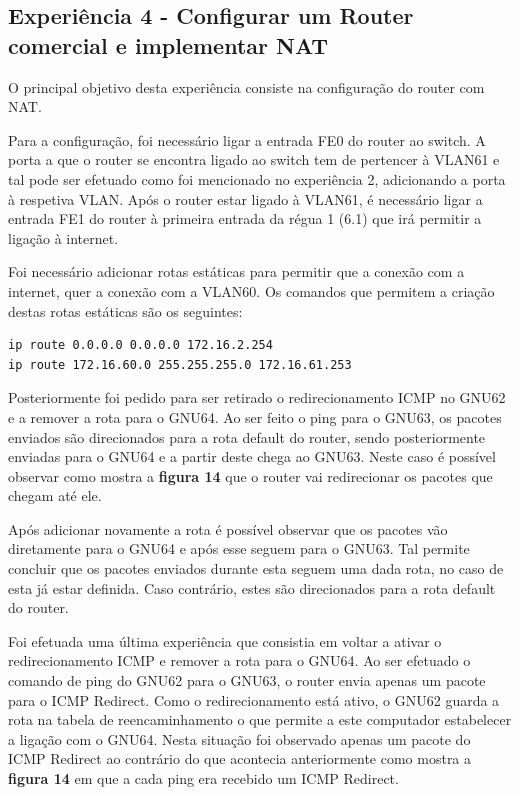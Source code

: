 \documentclass[article, a4paper, 11pt, oneside]{memoir}
\begin{document}
\subsection{Experiência 4 - Configurar um Router comercial e implementar NAT}

O principal objetivo desta experiência consiste na configuração do router com NAT.

Para a configuração, foi necessário ligar a entrada FE0 do router ao switch.
A porta a que o router se encontra ligado ao switch tem de pertencer à VLAN61 e tal pode ser efetuado como foi
mencionado no experiência 2, adicionando a porta à respetiva VLAN. Após o router estar ligado à VLAN61, 
é necessário ligar a entrada FE1 do router à primeira entrada da régua 1 (6.1) que irá permitir a ligação à internet.

Foi necessário adicionar rotas estáticas para permitir que a conexão com a internet, quer a conexão com a VLAN60.
Os comandos que permitem a criação destas rotas estáticas são os seguintes:

\begin{lstlisting} 
ip route 0.0.0.0 0.0.0.0 172.16.2.254
ip route 172.16.60.0 255.255.255.0 172.16.61.253
\end{lstlisting} 

Posteriormente foi pedido para ser retirado o redirecionamento ICMP no GNU62 e a remover a rota para o GNU64.
Ao ser feito o ping para o GNU63, os pacotes enviados são direcionados para a rota default do router, sendo posteriormente enviadas para o GNU64 e a partir deste
chega ao GNU63. Neste caso é possível observar como mostra a \textbf{figura 14} que o router vai redirecionar os pacotes que chegam até ele. 

Após adicionar novamente a rota é possível observar que os pacotes vão diretamente para o GNU64 e após esse seguem para o GNU63. 
Tal permite concluir que os pacotes enviados durante esta seguem uma dada rota, no caso de esta já estar definida. 
Caso contrário, estes são direcionados para a rota default do router. 

Foi efetuada uma última experiência que consistia em voltar a ativar o redirecionamento ICMP e remover a rota para o GNU64. 
Ao ser efetuado o comando de ping do GNU62 para o GNU63, o router envia apenas um pacote para o ICMP Redirect. Como o redirecionamento está ativo, o
GNU62 guarda a rota na tabela de reencaminhamento o que permite a este computador estabelecer a ligação com o GNU64. Nesta situação foi observado apenas um 
pacote do ICMP Redirect ao contrário do que acontecia anteriormente como mostra a \textbf{figura 14} em que a cada ping era recebido um ICMP Redirect.
\end{document}
